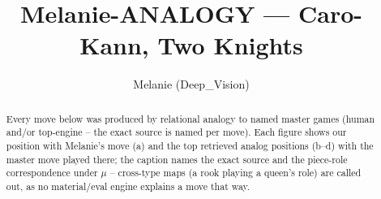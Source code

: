 \documentclass[11pt]{article}
\title{Melanie-ANALOGY — Caro-Kann, Two Knights}
\author{Melanie (Deep\_Vision)}
\date{}
\begin{document}
\maketitle

\begin{abstract}Every move below was produced by relational analogy to named master games (human and/or top-engine -- the exact source is named per move). Each figure shows our position with Melanie's move (a) and the top retrieved analog positions (b--d) with the master move played there; the caption names the exact source and the piece-role correspondence under $\mu$ -- cross-type maps (a rook playing a queen's role) are called out, as no material/eval engine explains a move that way.\end{abstract}

\begin{figure}[p]\centering
\begin{subfigure}{0.46\textwidth}\centering
\resizebox{\linewidth}{!}{%
\newchessgame
\chessboard[
  setfen={rn1qkb1r/pp3ppp/2p1pn2/3p4/3PP3/2N2Q1P/PPP2PP1/R1B1KB1R w KQkq - 0 7},
  showmover=false,
  pgfstyle=straightmove, color=movearrow, markmove={e4-d5}
]}
\caption{}
\end{subfigure}\hfill
\begin{subfigure}{0.46\textwidth}\centering
\resizebox{\linewidth}{!}{%
\newchessgame
\chessboard[
  setfen={rn1qkb1r/pp2pppp/2p2n2/3p4/4P3/2N2Q1P/PPPP1PP1/R1B1KB1R w KQkq - 1 6},
  showmover=false,
  pgfstyle=straightmove, color=movearrow, markmove={e4-d5}
]}
\caption{}
\end{subfigure}
\\[4pt]
\begin{subfigure}{0.46\textwidth}\centering
\resizebox{\linewidth}{!}{%
\newchessgame
\chessboard[
  setfen={rn1qkb1r/pp2pppp/2p2n2/3p4/4P3/2N2Q1P/PPPP1PP1/R1B1KB1R w KQkq - 1 6},
  showmover=false,
  pgfstyle=straightmove, color=movearrow, markmove={e4-d5}
]}
\caption{}
\end{subfigure}\hfill
\begin{subfigure}{0.46\textwidth}\centering
\resizebox{\linewidth}{!}{%
\newchessgame
\chessboard[
  setfen={rn1qkb1r/pp2pppp/2p2n2/3p4/4P3/2N2Q1P/PPPP1PP1/R1B1KB1R w KQkq - 1 6},
  showmover=false,
  pgfstyle=straightmove, color=movearrow, markmove={e4-d5}
]}
\caption{}
\end{subfigure}

\end{figure}
\end{document}

